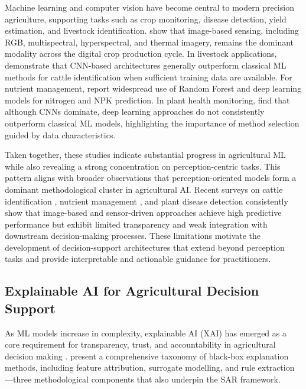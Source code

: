\documentclass[3p,twocolumn,authoryear]{elsarticle}
\begin{document}
Machine learning and computer vision have become central to modern
precision agriculture, supporting tasks such as crop monitoring, disease
detection, yield estimation, and livestock identification.
\citet{ghazal2024survey} show that image-based sensing, including RGB,
multispectral, hyperspectral, and thermal imagery, remains the dominant
modality across the digital crop production cycle.
In livestock applications, \citet{hossain2022cattle} demonstrate that
CNN-based architectures generally outperform classical ML methods for
cattle identification when sufficient training data are available.
For nutrient management, \citet{ennaji2023nutrient} report widespread use
of Random Forest and deep learning models for nitrogen and NPK prediction.
In plant health monitoring, \citet{omaye2024disease} find that although
CNNs dominate, deep learning approaches do not consistently outperform
classical ML models, highlighting the importance of method selection
guided by data characteristics.

Taken together, these studies indicate substantial progress in
agricultural ML while also revealing a strong concentration on
perception-centric tasks.
This pattern aligns with broader observations that perception-oriented
models form a dominant methodological cluster in agricultural AI.
Recent surveys on cattle identification \citep{hossain2022cattle},
nutrient management \citep{ennaji2023nutrient}, and plant disease
detection \citep{omaye2024disease} consistently show that image-based and
sensor-driven approaches achieve high predictive performance but exhibit
limited transparency and weak integration with downstream
decision-making processes.
These limitations motivate the development of decision-support
architectures that extend beyond perception tasks and provide
interpretable and actionable guidance for practitioners.

\subsection{Explainable AI for Agricultural Decision Support}

As ML models increase in complexity, explainable AI (XAI) has emerged as a
core requirement for transparency, trust, and accountability in
agricultural decision making \citep{arrieta2020,linardatos2021}.
\citet{guidotti2019} present a comprehensive taxonomy of black-box
explanation methods, including feature attribution, surrogate modelling,
and rule extraction—three methodological components that also underpin
the SAR framework.
\end{document}

